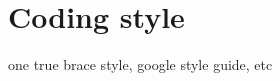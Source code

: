 \documentclass[oneside]{memoir}
\begin{document}
\section{Coding style}

one true brace style, google style guide, etc

\end{document}
